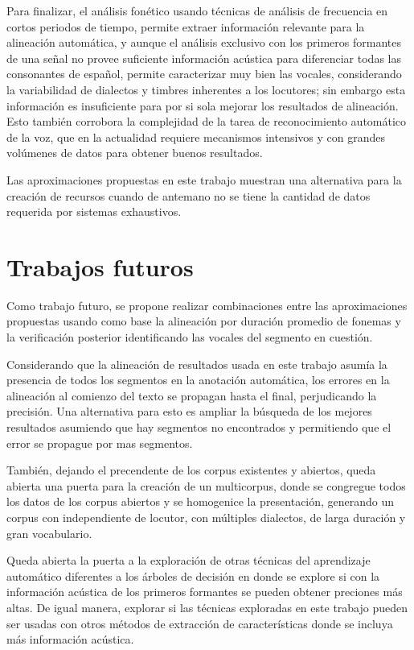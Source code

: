 Para finalizar, el análisis fonético usando técnicas de análisis de frecuencia en cortos periodos de tiempo, permite extraer información relevante para la alineación automática, y aunque el análisis exclusivo con los primeros formantes de una señal no provee suficiente información acústica para diferenciar todas las consonantes de español, permite caracterizar muy bien las vocales, considerando la variabilidad de dialectos y timbres inherentes a los locutores; sin embargo esta información es insuficiente para por si sola mejorar los resultados de alineación. Esto también corrobora la complejidad de la tarea de reconocimiento automático de la voz, que en la actualidad requiere mecanismos intensivos y con grandes volúmenes de datos para obtener buenos resultados.

Las aproximaciones propuestas en este trabajo muestran una alternativa para la creación de recursos cuando de antemano no se tiene la cantidad de datos requerida por sistemas exhaustivos.

\section{Trabajos futuros}


Como trabajo futuro, se propone realizar combinaciones entre las aproximaciones propuestas usando como base la alineación por duración promedio de fonemas y la verificación posterior identificando las vocales del segmento en cuestión.

Considerando que la alineación de resultados usada en este trabajo asumía la presencia de todos los segmentos en la anotación automática, los errores en la alineación al comienzo del texto se propagan hasta el final, perjudicando la precisión. Una alternativa para esto es ampliar la búsqueda de los mejores resultados asumiendo que hay segmentos no encontrados y permitiendo que el error se propague por mas segmentos.

También, dejando el precendente de los corpus existentes y abiertos, queda abierta una puerta para la creación de un multicorpus, donde se congregue todos los datos de los corpus abiertos y se homogenice la presentación, generando un corpus con independiente de locutor, con múltiples dialectos, de larga duración y gran vocabulario.

Queda abierta la puerta a la exploración de otras técnicas del aprendizaje automático diferentes a los árboles de decisión en donde se explore si con la información acústica de los primeros formantes se pueden obtener preciones más altas. De igual manera, explorar si las técnicas exploradas en este trabajo pueden ser usadas con otros métodos de extracción de características donde se incluya más información acústica.


